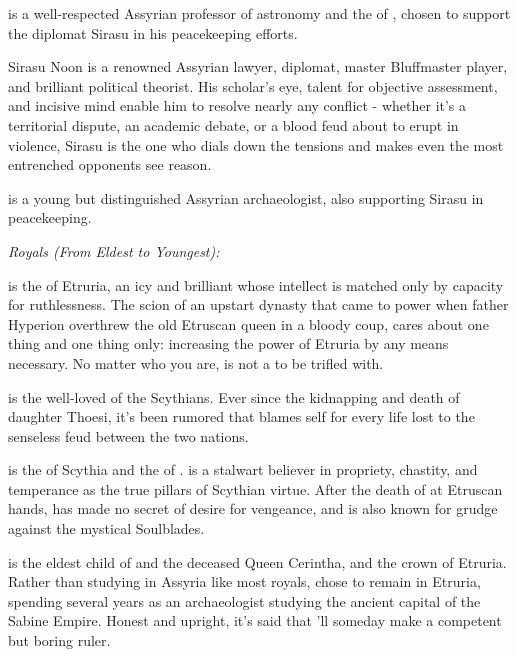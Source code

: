 \documentclass[blue]{Kos}
\begin{document}
\cAnarchist{} is a well-respected Assyrian professor of astronomy and the \cAnarchist{\sibling} of \cMerchant{}, chosen to support the diplomat Sirasu in his peacekeeping efforts.

Sirasu Noon is a renowned Assyrian lawyer, diplomat, master Bluffmaster player, and brilliant political theorist. His scholar's eye, talent for objective assessment, and incisive mind enable him to resolve nearly any conflict - whether it’s a territorial dispute, an academic debate, or a blood feud about to erupt in violence, Sirasu is the one who dials down the tensions and makes even the most entrenched opponents see reason.

\cArchaeologist{} is a young but distinguished Assyrian archaeologist, also supporting Sirasu in peacekeeping.

\emph{Royals (From Eldest to Youngest):}

\cEtruriaKing{} is the \cEtruriaKing{\monarch} of Etruria, an icy and brilliant \cEtruriaKing{\human} whose intellect is matched only by \cEtruriaKing{\their} capacity for ruthlessness. The scion of an upstart dynasty that came to power when \cEtruriaKing{\their} father Hyperion overthrew the old Etruscan queen in a bloody coup, \cEtruriaKing{\they} cares about one thing and one thing only: increasing the power of Etruria by any means necessary. No matter who you are, \cEtruriaKing{\they} is not a \cEtruriaKing{\human} to be trifled with.

\cScythiaKing{} is the well-loved \cScythiaKing{\monarch} of the Scythians. Ever since the kidnapping and death of \cScythiaKing{\their} daughter Thoesi, it’s been rumored that \cScythiaKing{\they} blames \cScythiaKing{\them}self for every life lost to the senseless feud between the two nations.

\cScythiaQueen{} is the \cScythiaQueen{\monarch} of Scythia and the \cScythiaQueen{\spouse} of \cScythiaKing{}. \cScythiaQueen{\They} is a stalwart believer in propriety, chastity, and temperance as the true pillars of Scythian virtue. After the death of \cScythiaQueen{\their} \cFugitive{\offspring} at Etruscan hands, \cScythiaQueen{} has made no secret of \cScythiaQueen{\their} desire for vengeance, and is also known for \cScythiaQueen{\their} grudge against the mystical Soulblades.

\cGroom{} is the eldest child of \cEtruriaKing{\Monarch} \cEtruriaKing{} and the deceased Queen Cerintha, and the crown \cGroom{\prince} of Etruria. Rather than studying in Assyria like most royals, \cGroom{\they} chose to remain in Etruria, spending several years as an archaeologist studying the ancient capital of the Sabine Empire. Honest and upright, it's said that \cGroom{\they}'ll someday make a competent but boring ruler.
\end{document}

